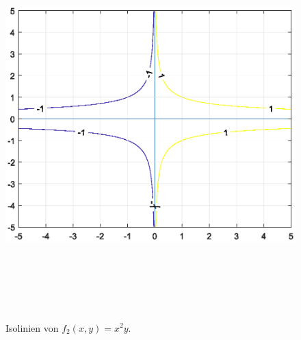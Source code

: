 {\begin{figure}[ht]
\begin{center}
\includegraphics[width=15cm, height=15cm]{../A/analysis/isolines_and_isosurfaces_001_aii.eps}
\caption{Isolinien von $f_2(x,y) = x^2y$.}
\label{f_2}
\end{center}
\end{figure}

}
